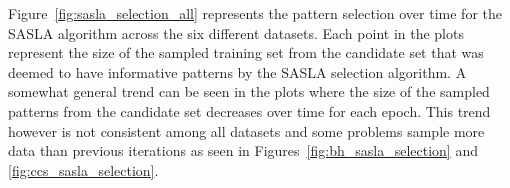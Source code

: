 \documentclass[conference]{IEEEtran}
\begin{document}
	Figure~\ref{fig:sasla_selection_all} represents the pattern selection over time for the SASLA algorithm across the six different datasets. Each point in the plots represent the size of the sampled training set from the candidate set that was deemed to have informative patterns by the SASLA selection algorithm. A somewhat general trend can be seen in the plots where the size of the sampled patterns from the candidate set decreases over time for each epoch. This trend however is not consistent among all datasets and some problems sample more data than previous iterations as seen in Figures~\ref{fig:bh_sasla_selection} and \ref{fig:ccs_sasla_selection}. 
	\begin{figure}[htbp]
		\centering
		\hfil
		
		\hfil
		

\end{figure}
\end{document}
